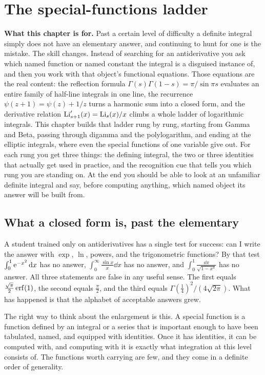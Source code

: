 \chapter{The special-functions ladder}

\begin{orient}
\textbf{What this chapter is for.} Past a certain level of difficulty a definite integral simply does not have an elementary answer, and continuing to hunt for one is the mistake. The skill changes. Instead of searching for an antiderivative you ask which named function or named constant the integral is a disguised instance of, and then you work with that object's functional equations. Those equations are the real content: the reflection formula $\Gamma(s)\Gamma(1-s)=\pi/\sin\pi s$ evaluates an entire family of half-line integrals in one line, the recurrence $\psi(z+1)=\psi(z)+1/z$ turns a harmonic sum into a closed form, and the derivative relation $\operatorname{Li}_{s+1}'(x)=\operatorname{Li}_s(x)/x$ climbs a whole ladder of logarithmic integrals. This chapter builds that ladder rung by rung, starting from Gamma and Beta, passing through digamma and the polylogarithm, and ending at the elliptic integrals, where even the special functions of one variable give out. For each rung you get three things: the defining integral, the two or three identities that actually get used in practice, and the recognition cue that tells you which rung you are standing on. At the end you should be able to look at an unfamiliar definite integral and say, before computing anything, which named object its answer will be built from.
\end{orient}

\section{What a closed form is, past the elementary}

A student trained only on antiderivatives has a single test for success: can I write the answer with $\exp$, $\ln$, powers, and the trigonometric functions? By that test $\int_0^1\mathrm{e}^{-x^{2}}\,\mathrm{d} x$ has no answer, $\int_0^{\infty}\frac{\sin x}{x}\dd x$ has no answer, and $\int_0^1\frac{\dd x}{\sqrt{1-x^{4}}}$ has no answer. All three statements are false in any useful sense. The first equals $\tfrac{\sqrt\pi}{2}\operatorname{erf}(1)$, the second equals $\tfrac{\pi}{2}$, and the third equals $\Gamma(\tfrac14)^{2}/(4\sqrt{2\pi})$. What has happened is that the alphabet of acceptable answers grew.

The right way to think about the enlargement is this. A special function is a function defined by an integral or a series that is important enough to have been tabulated, named, and equipped with identities. Once it has identities, it can be computed with, and computing with it is exactly what integration at this level consists of. The functions worth carrying are few, and they come in a definite order of generality.

